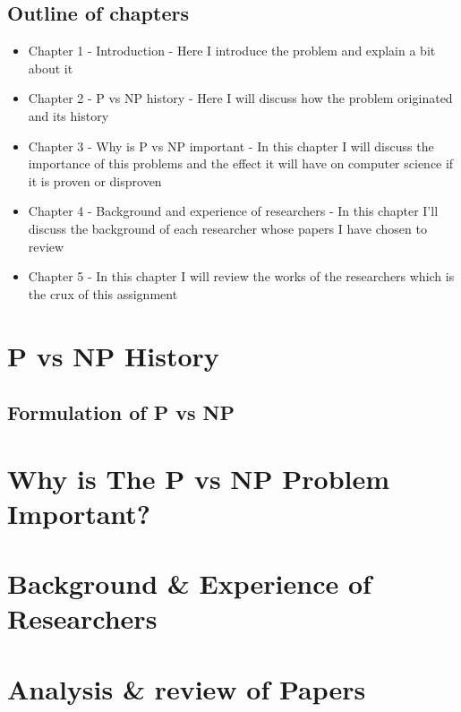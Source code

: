 \documentclass{report}
\begin{document}
\section{Outline of chapters}
\begin{itemize}
  \item Chapter 1 - Introduction - Here I introduce the problem and explain a bit
  about it
  \item  Chapter 2 - P vs NP history - Here I will discuss how the problem originated and its history
  \item Chapter 3 - Why is P vs NP important - In this chapter I will discuss the importance of this problems
  and the effect it will have on computer science if it is proven or disproven
  \item Chapter 4 - Background and experience of researchers - In this chapter I'll discuss the background of
  each researcher whose papers I have chosen to review
  \item Chapter 5 - In this chapter I will review the works of the researchers which is the crux of this assignment
\end{itemize}
\chapter{P vs NP History}
\section{Formulation of P vs NP}

\chapter{Why is The P vs NP Problem Important?}
\chapter{Background \& Experience of Researchers}
\chapter{Analysis \& review of Papers}



\end{document}
